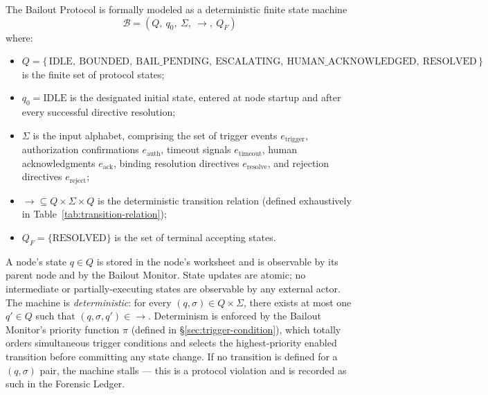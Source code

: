 The Bailout Protocol is formally modeled as a deterministic finite state machine
\[
\mathcal{B} = (Q,\ q_0,\ \Sigma,\ \rightarrow,\ Q_F)
\]
where:

\begin{itemize}\itemsep0em
\item $Q = \{\,\text{IDLE},\ \text{BOUNDED},\ \text{BAIL\_PENDING},\ \text{ESCALATING},\ \text{HUMAN\_ACKNOWLEDGED},\ \text{RESOLVED}\,\}$ is the finite set of protocol states;
\item $q_0 = \text{IDLE}$ is the designated initial state, entered at node startup and after every successful directive resolution;
\item $\Sigma$ is the input alphabet, comprising the set of trigger events $e_{\text{trigger}}$, authorization confirmations $e_{\text{auth}}$, timeout signals $e_{\text{timeout}}$, human acknowledgments $e_{\text{ack}}$, binding resolution directives $e_{\text{resolve}}$, and rejection directives $e_{\text{reject}}$;
\item $\rightarrow \subseteq Q \times \Sigma \times Q$ is the deterministic transition relation (defined exhaustively in Table~\ref{tab:transition-relation});
\item $Q_F = \{\text{RESOLVED}\}$ is the set of terminal accepting states.
\end{itemize}

A node's state $q \in Q$ is stored in the node's worksheet and is observable by its parent node and by the Bailout Monitor. State updates are atomic; no intermediate or partially-executing states are observable by any external actor. The machine is \emph{deterministic}: for every $(q, \sigma) \in Q \times \Sigma$, there exists at most one $q' \in Q$ such that $(q, \sigma, q') \in \rightarrow$. Determinism is enforced by the Bailout Monitor's priority function $\pi$ (defined in \S\ref{sec:trigger-condition}), which totally orders simultaneous trigger conditions and selects the highest-priority enabled transition before committing any state change. If no transition is defined for a $(q, \sigma)$ pair, the machine stalls — this is a protocol violation and is recorded as such in the Forensic Ledger.

